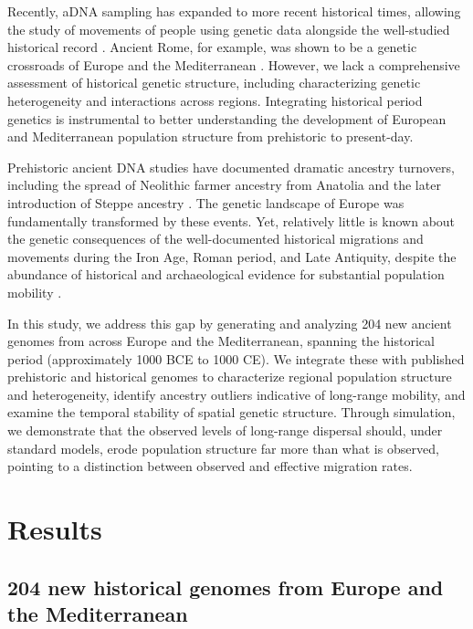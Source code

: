 \documentclass[11pt]{article}
\begin{document}
Recently, aDNA sampling has expanded to more recent historical times, allowing the study of movements of people using genetic data alongside the well-studied historical record \citep{antonio2019, olalde2018, ebenesersdottir2018, margaryan2020}. Ancient Rome, for example, was shown to be a genetic crossroads of Europe and the Mediterranean \citep{antonio2019}. However, we lack a comprehensive assessment of historical genetic structure, including characterizing genetic heterogeneity and interactions across regions. Integrating historical period genetics is instrumental to better understanding the development of European and Mediterranean population structure from prehistoric to present-day.

Prehistoric ancient DNA studies have documented dramatic ancestry turnovers, including the spread of Neolithic farmer ancestry from Anatolia \citep{broushaki2016, brace2019} and the later introduction of Steppe ancestry \citep{haak2015, damgaard2018, debarros2018}. The genetic landscape of Europe was fundamentally transformed by these events. Yet, relatively little is known about the genetic consequences of the well-documented historical migrations and movements during the Iron Age, Roman period, and Late Antiquity, despite the abundance of historical and archaeological evidence for substantial population mobility \citep{dejong2016, cherry2007}.

In this study, we address this gap by generating and analyzing 204 new ancient genomes from across Europe and the Mediterranean, spanning the historical period (approximately 1000 BCE to 1000 CE). We integrate these with published prehistoric and historical genomes to characterize regional population structure and heterogeneity, identify ancestry outliers indicative of long-range mobility, and examine the temporal stability of spatial genetic structure. Through simulation, we demonstrate that the observed levels of long-range dispersal should, under standard models, erode population structure far more than what is observed, pointing to a distinction between observed and effective migration rates.

\section{Results}

\subsection{204 new historical genomes from Europe and the Mediterranean}
\end{document}
